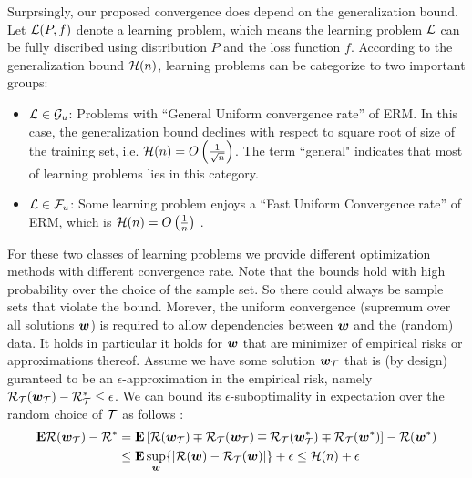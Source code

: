  Surprsingly, our proposed convergence does depend on the
generalization bound. Let ${\cal L}(P,f)$ denote a learning problem, which
means the learning problem ${\cal L}$ can be fully discribed using distribution $P$ and the loss
 function $f$. According to the generalization bound ${\cal H}(n)$, learning
 problems can be categorize to two important groups:
 \begin{itemize}
   \item ${\cal L} \in {\cal G}_{u}$: Problems with ``General Uniform
   convergence rate'' of ERM. In this case, the generalization bound declines
    with respect to square root of size of the training set, i.e. ${\cal H}(n) =
   O\left(\frac{1}{\sqrt{n}}\right)$.
   The term ``general" indicates that most of learning problems lies in this
   category.
   \item ${\cal L} \in {\cal F}_{u}$: Some learning problem enjoys a ``Fast Uniform
   Convergence rate'' of ERM, which is ${\cal H}(n) = O \left( \frac{1}{n}
   \right)$ \cite{bousquet2008tradeoffs}. 
 \end{itemize}
 For these two classes of learning problems we provide different optimization
 methods with different convergence rate. Note that the bounds hold with high
 probability over the choice of the sample set. So there could always be sample sets that violate the bound. Morever, the uniform convergence (supremum over all solutions $\bm{w}$) is required to allow dependencies between $\bm{w}$  and the (random) data. It holds in particular it holds for $\bm{w}$ that are minimizer of empirical risks or approximations thereof.
Assume we have some solution $\bm{w}_{\cal T}$ that is (by design) guranteed to be an
$\epsilon$-approximation in the empirical risk, namely ${\cal R}_{\cal T}(\bm{w}_{\cal T}) - {\cal R}_{\cal T}^* \le \epsilon$.
 We can bound its $\epsilon$-suboptimality in expectation over the random choice of
 ${\cal T}$ as follows \cite{bousquet2008tradeoffs}:
\begin{align}
\label{eq:exprisk-bound}
\mathbf{E} {\cal R}(\bm{w}_{\cal T}) - {\cal R}^*  & = 
\mathbf{E} \left[ {\cal R}(\bm{w}_{\cal T}) \mp {\cal R}_{{\cal T}}(\bm{w}_{{\cal T}}) \mp {\cal R}_{{\cal T}}(\bm{w}_{{\cal T}}^*) \mp
{\cal R}_{\cal T}(\bm{w}^*) \right]   - {\cal R}(\bm{w}^*)
\\ & \le \mathbf{E} \sup_{\bm{w}} \{ | {\cal R}(\bm{w}) -  {\cal R}_{\cal T}(\bm{w}) | \} + \epsilon  \le 
{\cal H}(n) + \epsilon
\nonumber
\end{align}

